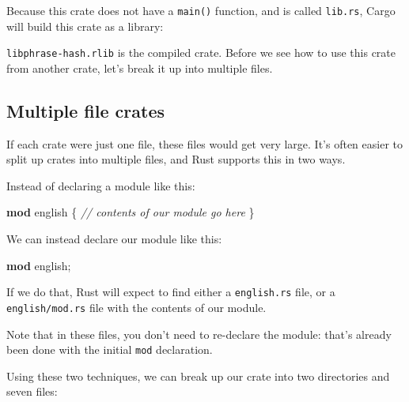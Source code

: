 \documentclass[a4paper,]{book}
\newenvironment{Shaded}{\begin{snugshade}}{\end{snugshade}}
\newcommand{\KeywordTok}[1]{\textcolor[rgb]{0.13,0.29,0.53}{\textbf{{#1}}}}
\newcommand{\CommentTok}[1]{\textcolor[rgb]{0.56,0.35,0.01}{\textit{{#1}}}}
\newcommand{\NormalTok}[1]{{#1}}
\begin{document}
Because this crate does not have a \texttt{main()} function, and is
called \texttt{lib.rs}, Cargo will build this crate as a library:

\begin{Shaded}
\end{Shaded}

\texttt{libphrase-hash.rlib} is the compiled crate. Before we see how to
use this crate from another crate, let's break it up into multiple
files.

\subsection{Multiple file crates}\label{multiple-file-crates}

If each crate were just one file, these files would get very large. It's
often easier to split up crates into multiple files, and Rust supports
this in two ways.

Instead of declaring a module like this:

\begin{Shaded}
\begin{Highlighting}[]
\KeywordTok{mod} \NormalTok{english \{}
    \CommentTok{// contents of our module go here}
\NormalTok{\}}
\end{Highlighting}
\end{Shaded}

We can instead declare our module like this:

\begin{Shaded}
\begin{Highlighting}[]
\KeywordTok{mod} \NormalTok{english;}
\end{Highlighting}
\end{Shaded}

If we do that, Rust will expect to find either a \texttt{english.rs}
file, or a \texttt{english/mod.rs} file with the contents of our module.

Note that in these files, you don't need to re-declare the module:
that's already been done with the initial \texttt{mod} declaration.

Using these two techniques, we can break up our crate into two
directories and seven files:
\end{document}

